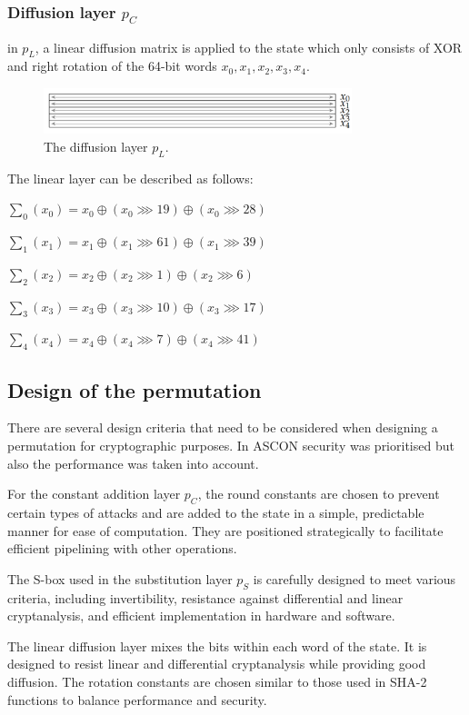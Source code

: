\subsubsection{Diffusion layer $p_C$}
in $p_L$, a linear diffusion matrix is applied to the state which only consists of XOR and right rotation of the 64-bit words $x_0, x_1, x_2, x_3, x_4$. \cite{ascon_specification, analysis_of_ascon}

\begin{figure}[htbp]
  \centering
  \includegraphics[width=0.8\textwidth]{images/diffusion.png}
  \caption{The diffusion layer $p_L$.}
  \label{fig:diffusion}
\end{figure}

The linear layer can be described as follows:


$\sum_0 (x_0) = x_0 \oplus (x_0 \ggg 19) \oplus (x_0 \ggg 28)$

$\sum_1 (x_1) = x_1 \oplus (x_1 \ggg 61) \oplus (x_1 \ggg 39)$

$\sum_2 (x_2) = x_2 \oplus (x_2 \ggg 1) \oplus (x_2 \ggg 6)$

$\sum_3 (x_3) = x_3 \oplus (x_3 \ggg 10) \oplus (x_3 \ggg 17)$

$\sum_4 (x_4) = x_4 \oplus (x_4 \ggg 7) \oplus (x_4 \ggg 41)$ 

\cite{ascon_specification,analysis_of_ascon}


\subsection{Design of the permutation}

There are several design criteria that need to be considered when designing a permutation for cryptographic purposes. In ASCON security was prioritised but also the performance was taken into account. \par

For the constant addition layer $p_C$, the round constants are chosen to prevent certain types of attacks and are added to the state in a simple, predictable manner for ease of computation. They are positioned strategically to facilitate efficient pipelining with other operations. \par

The S-box used in the substitution layer $p_S$ is carefully designed to meet various criteria, including invertibility, resistance against differential and linear cryptanalysis, and efficient implementation in hardware and software. \par

The linear diffusion layer mixes the bits within each word of the state. It is designed to resist linear and differential cryptanalysis while providing good diffusion. The rotation constants are chosen similar to those used in SHA-2 functions to balance performance and security. \par

\cite{DBLP:journals/joc/DobraunigEMS21}


